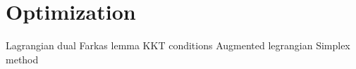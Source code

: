\part{Optimization}







Lagrangian dual
Farkas lemma
KKT conditions
Augmented legrangian
Simplex method
